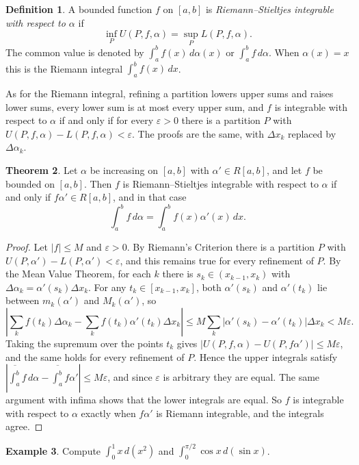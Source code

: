 \documentclass[11pt,a4paper]{article}
\numberwithin{equation}{section}
\theoremstyle{definition}
\newtheorem{thm}{Theorem}[subsection]
\newtheorem{defn}[thm]{Definition}
\newtheorem{exa}[thm]{Example}
\begin{document}
\begin{defn}
A bounded function $f$ on $[a,b]$ is \emph{Riemann--Stieltjes integrable with respect to $\alpha$} if
$$\inf_P U(P,f,\alpha) = \sup_P L(P,f,\alpha) .$$
The common value is denoted by $\int^b_af(x)\, d\alpha (x)$ or $\int^b_af\, d\alpha$. When $\alpha (x) = x$ this is the Riemann integral $\int^b_af(x)\, dx$.
\end{defn}

As for the Riemann integral, refining a partition lowers upper sums and raises lower sums, every lower sum is at most every upper sum, and $f$ is integrable with respect to $\alpha$ if and only if for every $\varepsilon>0$ there is a partition $P$ with $U(P,f,\alpha) - L(P,f,\alpha)<\varepsilon$. The proofs are the same, with $\Delta x_k$ replaced by $\Delta\alpha_k$.

\begin{thm}\label{thm:rsderiv}
Let $\alpha$ be increasing on $[a,b]$ with $\alpha'\in R[a,b]$, and let $f$ be bounded on $[a,b]$. Then $f$ is Riemann--Stieltjes integrable with respect to $\alpha$ if and only if $f\alpha'\in R[a,b]$, and in that case
$$\int_a^bf\,d\alpha = \int_a^bf(x)\alpha'(x)\,dx .$$
\end{thm}

\begin{proof}
Let $|f|\leq M$ and $\varepsilon>0$. By Riemann's Criterion there is a partition $P$ with $U(P,\alpha') - L(P,\alpha')<\varepsilon$, and this remains true for every refinement of $P$. By the Mean Value Theorem, for each $k$ there is $s_k\in(x_{k-1},x_k)$ with $\Delta\alpha_k = \alpha'(s_k)\Delta x_k$. For any $t_k\in[x_{k-1},x_k]$, both $\alpha'(s_k)$ and $\alpha'(t_k)$ lie between $m_k(\alpha')$ and $M_k(\alpha')$, so
$$\left|\sum_kf(t_k)\Delta\alpha_k - \sum_kf(t_k)\alpha'(t_k)\Delta x_k\right| \leq M\sum_k|\alpha'(s_k) - \alpha'(t_k)|\Delta x_k < M\varepsilon .$$
Taking the supremum over the points $t_k$ gives $|U(P,f,\alpha) - U(P,f\alpha')|\leq M\varepsilon$, and the same holds for every refinement of $P$. Hence the upper integrals satisfy $\left|\overline{\int_a^b}f\,d\alpha - \overline{\int_a^b}f\alpha'\right|\leq M\varepsilon$, and since $\varepsilon$ is arbitrary they are equal. The same argument with infima shows that the lower integrals are equal. So $f$ is integrable with respect to $\alpha$ exactly when $f\alpha'$ is Riemann integrable, and the integrals agree.
\end{proof}


\begin{exa}
Compute $\int_0^1x\,d(x^2)$ and $\int_0^{\pi/2}\cos x\,d(\sin x)$.
\end{exa}
\end{document}
